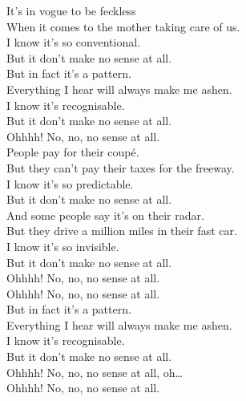 
\label{album:paper-mache-dream-balloon}




It's in vogue to be feckless \\
When it comes to the mother taking care of us. \\
I know it's so conventional. \\
But it don't make no sense at all. \\

But in fact it's a pattern. \\
Everything I hear will always make me ashen. \\
I know it's recognisable. \\
But it don't make no sense at all. \\

Ohhhh! No, no, no sense at all. \\

People pay for their coupé. \\
But they can't pay their taxes for the freeway. \\
I know it's so predictable. \\
But it don't make no sense at all. \\

And some people say it's on their radar. \\
But they drive a million miles in their fast car. \\
I know it's so invisible. \\
But it don't make no sense at all. \\

Ohhhh! No, no, no sense at all. \\
Ohhhh! No, no, no sense at all. \\

But in fact it's a pattern. \\
Everything I hear will always make me ashen. \\
I know it's recognisable. \\
But it don't make no sense at all. \\

Ohhhh! No, no, no sense at all, oh… \\
Ohhhh! No, no, no sense at all. \\

